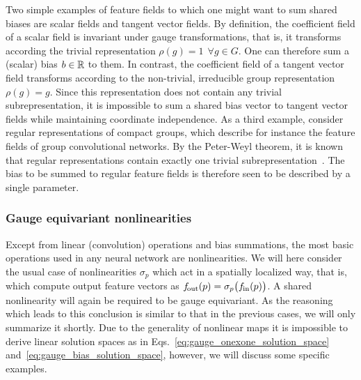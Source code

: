 Two simple examples of feature fields to which one might want to sum shared biases are scalar fields and tangent vector fields.
By definition, the coefficient field of a scalar field is invariant under gauge transformations, that is, it transforms according the trivial representation ${\rho(g)=1\ \ \forall g\in G}$.
One can therefore sum a (scalar) bias $b \in \mathbb{R}$ to them.
In contrast, the coefficient field of a tangent vector field transforms according to the non-trivial, irreducible group representation $\rho(g)=g$.
Since this representation does not contain any trivial subrepresentation, it is impossible to sum a shared bias vector to tangent vector fields while maintaining coordinate independence.
As a third example, consider regular representations of compact groups, which describe for instance the feature fields of group convolutional networks.
By the Peter-Weyl theorem, it is known that regular representations contain exactly one trivial subrepresentation~\cite{gurarie1992symmetries,gallier2019harmonicRepr}.
The bias to be summed to regular feature fields is therefore seen to be described by a single parameter.
















\subsubsection{Gauge equivariant nonlinearities}
\label{sec:gauge_nonlinearities}


Except from linear (convolution) operations and bias summations, the most basic operations used in any neural network are nonlinearities.
We will here consider the usual case of nonlinearities $\sigma_p$ which act in a spatially localized way, that is, which compute output feature vectors as $f_\textup{\:\!\!out}(p) = \sigma_p\big( f_\textup{\;\!\!in}(p) \big)$.
A shared nonlinearity will again be required to be gauge equivariant.
As the reasoning which leads to this conclusion is similar to that in the previous cases, we will only summarize it shortly.
Due to the generality of nonlinear maps it is impossible to derive linear solution spaces as in Eqs.~\eqref{eq:gauge_onexone_solution_space} and~\eqref{eq:gauge_bias_solution_space}, however, we will discuss some specific examples.


